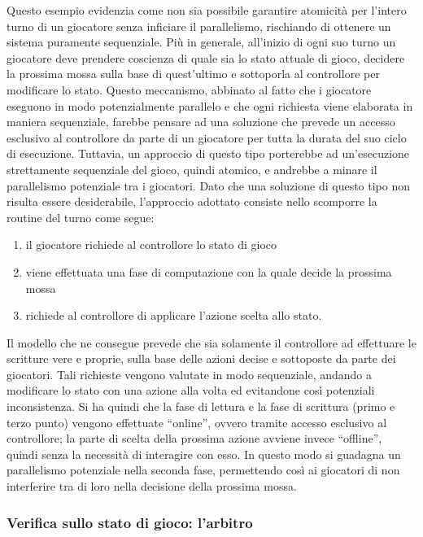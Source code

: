 Questo esempio evidenzia come non sia possibile garantire atomicità per l'intero turno di un giocatore senza inficiare il parallelismo, rischiando di ottenere un sistema puramente sequenziale. Più in generale, all'inizio di ogni suo turno un giocatore deve prendere coscienza di quale sia lo stato attuale di gioco, decidere la prossima mossa sulla base di quest'ultimo e sottoporla al controllore per modificare lo stato. Questo meccanismo, abbinato al fatto che i giocatore eseguono in modo potenzialmente parallelo e che ogni richiesta viene elaborata in maniera sequenziale, farebbe pensare ad una soluzione che prevede un accesso esclusivo al controllore da parte di un giocatore per tutta la durata del suo ciclo di esecuzione. Tuttavia, un approccio di questo tipo porterebbe ad un'esecuzione strettamente sequenziale del gioco, quindi atomico, e andrebbe a minare il parallelismo potenziale tra i giocatori. Dato che una soluzione di questo tipo non risulta essere desiderabile, l'approccio adottato consiste nello scomporre la routine del turno come segue:\\

\begin{enumerate}
	\item il giocatore richiede al controllore lo stato di gioco
	\item viene effettuata una fase di computazione con la quale decide la prossima mossa
	\item richiede al controllore di applicare l'azione scelta allo stato.
\end{enumerate}

Il modello che ne consegue prevede che sia solamente il controllore ad effettuare le scritture vere e proprie, sulla base delle azioni decise e sottoposte da parte dei giocatori. Tali richieste vengono valutate in modo sequenziale, andando a modificare lo stato con una azione alla volta ed evitandone così potenziali inconsistenza. Si ha quindi che la fase di lettura e la fase di scrittura (primo e terzo punto) vengono effettuate “online”, ovvero tramite accesso esclusivo al controllore; la parte di scelta della prossima azione avviene invece “offline”, quindi senza la necessità di interagire con esso. In questo modo si guadagna un parallelismo potenziale nella seconda fase, permettendo così ai giocatori di non interferire tra di loro nella decisione della prossima mossa.\\

\subsubsection{Verifica sullo stato di gioco: l'arbitro}
\label{sec:modello_verifica_arbitro}

